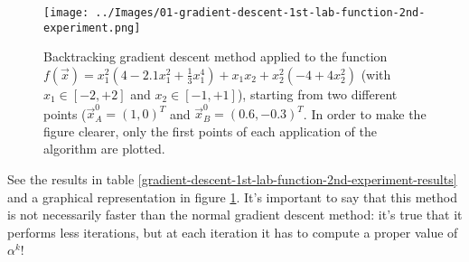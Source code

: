         \begin{figure}
            \centering
            \texttt{[image: ../Images/01-gradient-descent-1st-lab-function-2nd-experiment.png]}
            \caption{Backtracking gradient descent method applied to the function \(f(\vec{x}) = x_1^2(4 - 2.1x_1^2 + \frac{1}{3}x_1^4) + x_1x_2 + x_2^2(-4 + 4x_2^2)\) (with \(x_1 \in [-2, +2]\) and \(x_2 \in [-1, +1]\)), starting from two different points (\(\vec{x}_A^0 = (1,0)^T\) and \(\vec{x}_B^0 = (0.6, -0.3)^T\). In order to make the figure clearer, only the first points of each application of the algorithm are plotted.}
            \label{gradient-descent-1st-lab-function-2nd-experiment}
        \end{figure}
        See the results in table \ref{gradient-descent-1st-lab-function-2nd-experiment-results} and a graphical representation in figure \ref{gradient-descent-1st-lab-function-2nd-experiment}. It's important to say that this method is not necessarily faster than the normal gradient descent method: it's true that it performs less iterations, but at each iteration it has to compute a proper value of \(\alpha^k\)!
